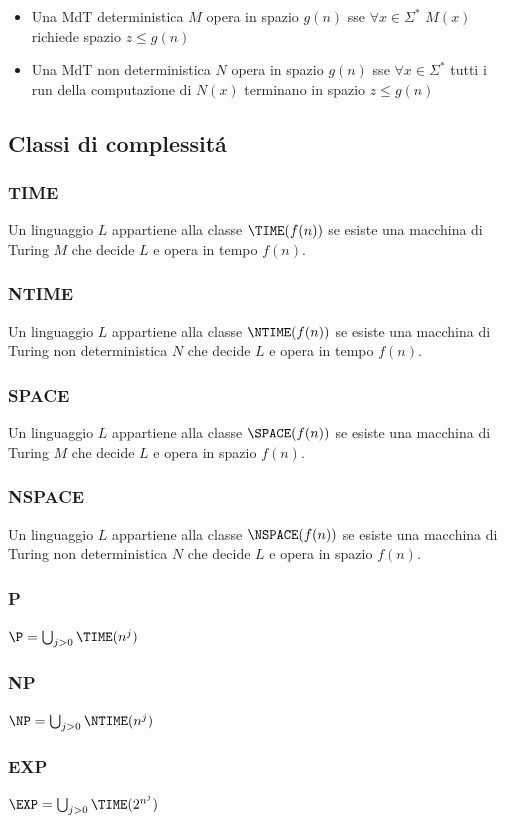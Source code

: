 \begin{itemize}
\item {Una MdT deterministica $M$ {opera} in spazio $g(n)$ sse $\forall x \in \Sigma^*$ $M(x)$ richiede spazio $z \leq g(n)$}
\item {Una MdT non deterministica $N$ {opera} in spazio $g(n)$ sse $\forall x \in \Sigma^*$ tutti i run della computazione di $N(x)$ terminano in spazio $z \leq g(n)$}
\end{itemize}


\subsection{Classi di complessitá}
\subsubsection{TIME}
Un linguaggio $L$ appartiene alla classe $\TIME(f(n))$ se esiste una macchina di Turing $M$ che decide $L$ e opera in tempo $f(n)$.
\subsubsection{NTIME}
Un linguaggio $L$ appartiene alla classe $\NTIME(f(n))$ se esiste una macchina di Turing non deterministica $N$ che decide $L$ e opera in tempo $f(n)$.
\subsubsection{SPACE}
Un linguaggio $L$ appartiene alla classe $\SPACE(f(n))$ se esiste una macchina di Turing $M$ che decide $L$ e opera in spazio $f(n)$.
\subsubsection{NSPACE}
Un linguaggio $L$ appartiene alla classe $\NSPACE(f(n))$ se esiste una macchina di Turing non deterministica $N$ che decide $L$ e opera in spazio $f(n)$.
\subsubsection{P}
$\P = \bigcup_{j>0} \TIME(n^j)$
\subsubsection{NP}
$\NP = \bigcup_{j>0} \NTIME(n^j)$
\subsubsection{EXP}
$\EXP = \bigcup_{j>0} \TIME(2^{n^j})$
